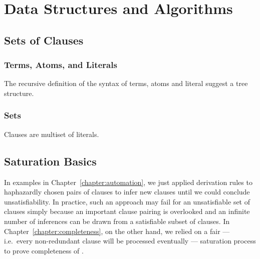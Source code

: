 
\chapter{Data Structures and Algorithms}



\section{Sets of Clauses}

\subsection{Terms, Atoms, and Literals}

The recursive definition of the syntax of terms, atoms and literal suggest a tree structure.



\subsection{Sets}

Clauses are multiset of literals.


\section{Saturation Basics}\label{sec:saturation:basics}

In examples in Chapter~\ref{chapter:automation},
we just applied derivation rules
to haphazardly chosen pairs of clauses
to infer new clauses
until we could conclude unsatisfiability.
%
In practice, such an approach may fail for an unsatisfiable set of clauses
simply because an important clause pairing is overlooked
and an infinite number of inferences can be drawn
from a satisfiable subset of clauses.
%
In Chapter~\ref{chapter:completeness}, on the other hand,
we relied on a fair ---
i.e.\ every non-redundant clause will be processed eventually ---
saturation process to prove completeness of \InstGenEQ{}.

